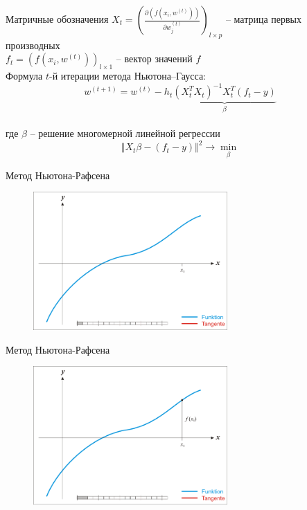\documentclass[10pt]{beamer}
\begin{document}
\begin{frame}{Матричные обозначения}
	$X_t = \left(\frac{\partial(f(x_i, w^{(t)}))}{\partial w_j^{(t)}}\right)_{l \times p}$ -- матрица первых производных\\
	$f_t = \left( f(x_i, w^{(t)}) \right)_{l \times 1}$ -- вектор значений $f$\\
	\bigbreak
	Формула $t$-й итерации метода Ньютона–Гаусса:\\
	$$w^{(t+1)} = w^{(t)} - h_t \underbrace{\left( X^T_t X_t \right)^{-1} X_t^T(f_t -y)}_{\beta}$$\\
	где $\beta$ -- решение многомерной линейной регрессии\\
	$$\Vert X_t\beta - (f_t-y) \Vert^2 \rightarrow \min_{\beta}$$ 
\end{frame}

\begin{frame}{Метод Ньютона-Рафсена}
	\begin{figure}[htbp]
	  \includegraphics[height=150pt, keepaspectratio = true]{images/newton-1}   
	\end{figure}
\end{frame}

\begin{frame}{Метод Ньютона-Рафсена}
	\begin{figure}[htbp]
	  \includegraphics[height=150pt, keepaspectratio = true]{images/newton-2}   
	\end{figure}
\end{frame}
\end{document}
